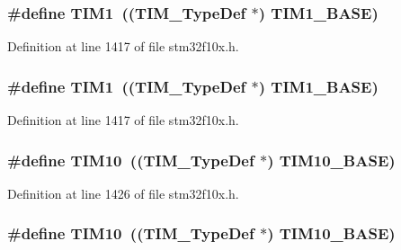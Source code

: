 \subsubsection[{\texorpdfstring{T\+I\+M1}{TIM1}}]{\setlength{\rightskip}{0pt plus 5cm}\#define T\+I\+M1~(({\bf T\+I\+M\+\_\+\+Type\+Def} $\ast$) {\bf T\+I\+M1\+\_\+\+B\+A\+SE})}\hypertarget{group___peripheral__declaration_ga2e87451fea8dc9380056d3cfc5ed81fb}{}\label{group___peripheral__declaration_ga2e87451fea8dc9380056d3cfc5ed81fb}


Definition at line 1417 of file stm32f10x.\+h.

\subsubsection[{\texorpdfstring{T\+I\+M1}{TIM1}}]{\setlength{\rightskip}{0pt plus 5cm}\#define T\+I\+M1~(({\bf T\+I\+M\+\_\+\+Type\+Def} $\ast$) {\bf T\+I\+M1\+\_\+\+B\+A\+SE})}\hypertarget{group___peripheral__declaration_ga2e87451fea8dc9380056d3cfc5ed81fb}{}\label{group___peripheral__declaration_ga2e87451fea8dc9380056d3cfc5ed81fb}


Definition at line 1417 of file stm32f10x.\+h.

\subsubsection[{\texorpdfstring{T\+I\+M10}{TIM10}}]{\setlength{\rightskip}{0pt plus 5cm}\#define T\+I\+M10~(({\bf T\+I\+M\+\_\+\+Type\+Def} $\ast$) {\bf T\+I\+M10\+\_\+\+B\+A\+SE})}\hypertarget{group___peripheral__declaration_ga46b2ad3f5f506f0f8df0d2ec3e767267}{}\label{group___peripheral__declaration_ga46b2ad3f5f506f0f8df0d2ec3e767267}


Definition at line 1426 of file stm32f10x.\+h.

\subsubsection[{\texorpdfstring{T\+I\+M10}{TIM10}}]{\setlength{\rightskip}{0pt plus 5cm}\#define T\+I\+M10~(({\bf T\+I\+M\+\_\+\+Type\+Def} $\ast$) {\bf T\+I\+M10\+\_\+\+B\+A\+SE})}\hypertarget{group___peripheral__declaration_ga46b2ad3f5f506f0f8df0d2ec3e767267}{}\label{group___peripheral__declaration_ga46b2ad3f5f506f0f8df0d2ec3e767267}



